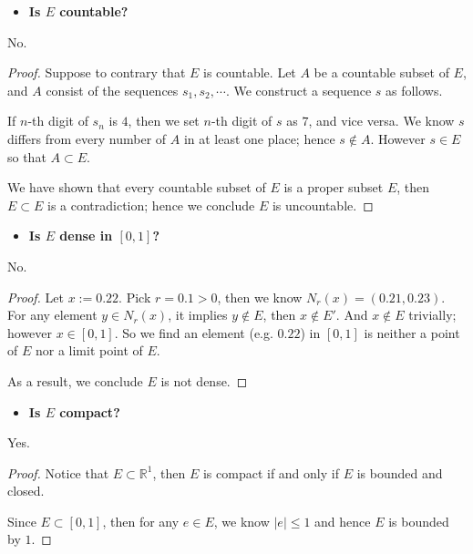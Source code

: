 \begin{Exercise}
	\begin{itemize}
		\item \textbf{Is $E$ countable?}
	\end{itemize}
	\begin{answer}
		No.
	\end{answer}
	\begin{proof}
		Suppose to contrary that $E$ is countable. Let $A$ be a countable subset of $E$, and $A$ consist of the sequences $s_1, s_2, \cdots$. We construct a sequence $s$ as follows.
		
		If $n$-th digit of $s_n$ is $4$, then we set $n$-th digit of $s$ as $7$, and vice versa. We know $s$ differs from every number of $A$ in at least one place; hence $s\notin A$. However $s\in E$ so that $A\subset E$.
		
		We have shown that every countable subset of $E$ is a proper subset $E$, then $E\subset E$ is a contradiction; hence we conclude $E$ is uncountable.
	\end{proof}
	
	\begin{itemize}
		\item \textbf{Is $E$ dense in $[0,1]$?}
	\end{itemize}
	\begin{answer}
		No.
	\end{answer}
	\begin{proof}
		Let $x := 0.22$. Pick $r = 0.1 > 0$, then we know $N_r(x) = (0.21, 0.23)$. For any element $y\in N_r(x)$, it implies $y\notin E$, then $x\notin E'$. And $x\notin E$ trivially; however $x\in [0,1]$. So we find an element (e.g. $0.22$) in $[0,1]$ is neither a point of $E$ nor a limit point of $E$.
		
		As a result, we conclude $E$ is not dense.
	\end{proof}
	
	\begin{itemize}
		\item \textbf{Is $E$ compact?}
	\end{itemize}
	\begin{answer}
		Yes.
	\end{answer}
	\begin{proof}
		Notice that $E\subset \mathbb{R}^1$, then $E$ is compact if and only if $E$ is bounded and closed.
		
		Since $E\subset[0,1]$, then for any $e\in E$, we know $|e| \leq 1$ and hence $E$ is bounded by $1$.
		

\end{proof}
\end{Exercise}
